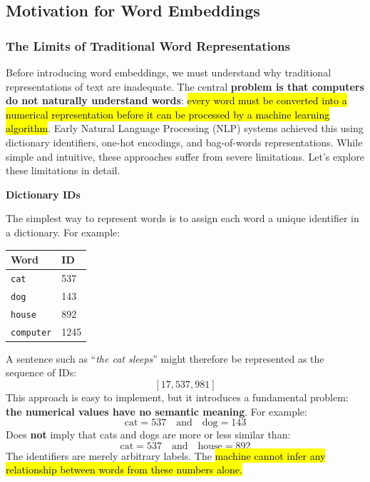 \subsection{Motivation for Word Embeddings}\label{sec:motivation-for-word-embeddings}

\subsubsection{The Limits of Traditional Word Representations}\label{sec:the-limits-of-traditional-word-representations}

Before introducing word embeddings, we must understand why traditional representations of text are inadequate. The central \textbf{problem is that computers do not naturally understand words}: \hl{every word must be converted into a numerical representation before it can be processed by a machine learning algorithm}. Early Natural Language Processing (NLP) systems achieved this using dictionary identifiers, one-hot encodings, and bag-of-words representations. While simple and intuitive, these approaches suffer from severe limitations. Let's explore these limitations in detail.

\highspace
\begin{flushleft}
    \textcolor{Red2}{ \textbf{Dictionary IDs}}
\end{flushleft}
The simplest way to represent words is to assign each word a unique identifier in a dictionary. For example:
\begin{center}
    \begin{tabular}{@{} l l @{}}
        \toprule
        \textbf{Word} & \textbf{ID} \\
        \midrule
        \texttt{cat} & 537 \\
        \texttt{dog} & 143 \\
        \texttt{house} & 892 \\
        \texttt{computer} & 1245 \\
        \bottomrule
    \end{tabular}
\end{center}

\noindent
A sentence such as ``\emph{the cat sleeps}'' might therefore be represented as the sequence of IDs:
\begin{equation*}
    \left[17, 537, 981\right]
\end{equation*}
This approach is easy to implement, but it introduces a fundamental problem: \textbf{the numerical values have no semantic meaning}. For example:
\begin{equation*}
    \text{cat} = 537 \quad \text{and} \quad \text{dog} = 143
\end{equation*}
Does \textbf{not} imply that cats and dogs are more or less similar than:
\begin{equation*}
    \text{cat} = 537 \quad \text{and} \quad \text{house} = 892
\end{equation*}
The identifiers are merely arbitrary labels. The \hl{machine cannot infer any relationship between words from these numbers alone.}


